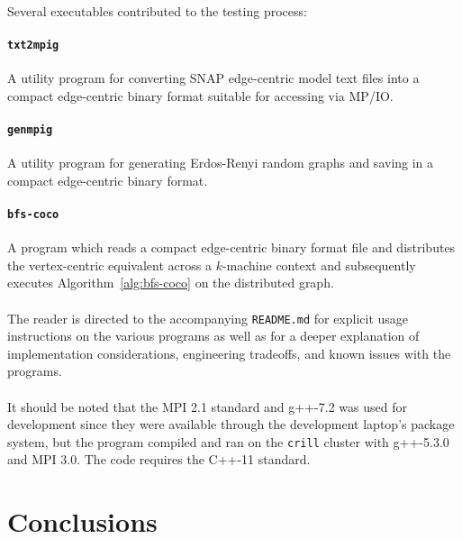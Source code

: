 \documentclass[11pt,epsf]{article}
\newcommand{\TODO}[0]{\textbf{\color{red}{TODO}}}
\begin{document}
{{    \paragraph{}{
      Several executables contributed to the testing process:
    }
    \paragraph{\texttt{txt2mpig}}{
      A utility program for converting SNAP edge-centric model text files
      into a compact edge-centric binary format suitable for accessing via MP/IO.
    }
    \paragraph{\texttt{genmpig}}{
      A utility program for generating Erdos-Renyi random graphs and saving
      in a compact edge-centric binary format.
    }
    \paragraph{\texttt{bfs-coco}}{
      A program which reads a compact edge-centric binary format file and
      distributes the vertex-centric equivalent across a $k$-machine context
      and subsequently executes Algorithm~\ref{alg:bfs-coco} on the distributed graph.
    }
    \paragraph{}{
      The reader is directed to the accompanying \texttt{README.md} for
      explicit usage instructions on the various programs as well as
      for a deeper explanation of implementation considerations,
      engineering tradeoffs, and known issues with the programs.
    }
    \paragraph{}{
      It should be noted that the MPI 2.1 standard\autocite{MPI21} and g++-7.2
      was used for development since they were available through the development
      laptop's package system, but the program compiled and ran on the \texttt{crill}
      cluster with g++-5.3.0 and MPI 3.0. The code requires the C++-11 standard.
    }
  }
}

\section{Conclusions}{
  \paragraph{}{
    \TODO
  }
}

\printbibliography
\end{document}
